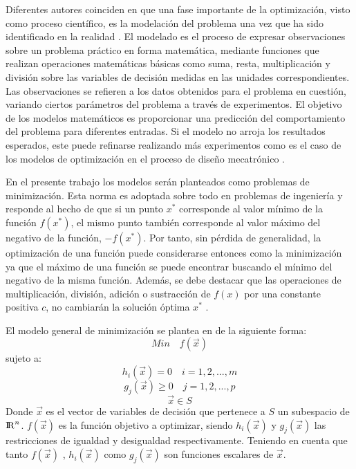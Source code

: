 Diferentes autores coinciden en que una fase importante de la optimización, visto como proceso científico, es la modelación del problema una vez que ha sido identificado en la realidad \cite{rao_engineering_2009} \cite{nocedal2006numerical} \cite{luenberger_linear_2015}. El modelado es el proceso de expresar observaciones sobre un problema práctico en forma matemática, mediante funciones que realizan operaciones matemáticas básicas como suma, resta, multiplicación y división sobre las variables de decisión medidas en las unidades correspondientes. Las observaciones se refieren a los datos obtenidos para el problema en cuestión, variando ciertos parámetros del problema a través de experimentos. El objetivo de los  modelos matemáticos es proporcionar una predicción del comportamiento del problema para diferentes entradas. Si el modelo no arroja los resultados esperados, este puede refinarse realizando más experimentos como es el caso de los modelos de optimización en el proceso de diseño mecatrónico \cite{arora_optimization:_2015}.  

En el presente trabajo los modelos serán planteados como problemas de minimización. Esta norma es adoptada sobre todo en problemas de ingeniería y responde al hecho de que si un punto $x^*$ corresponde al valor mínimo de la función $f(x^*)$, el mismo punto también corresponde al valor máximo del negativo de la función, $-f(x^*)$. Por tanto, sin pérdida de generalidad, la optimización de una función puede considerarse entonces como la minimización ya que el máximo de una función se puede encontrar buscando el mínimo del negativo de la misma función. Además, se debe destacar que las operaciones de multiplicación, división, adición o sustracción de $f(x)$ por una constante positiva $c$, no cambiarán la solución óptima $x^*$ \cite{rao_engineering_2009}. 

El modelo general de minimización se plantea en \cite{luenberger_linear_2015} de la siguiente forma:
\begin{equation}
Min\quad  f(\vec{x})
\end{equation}
sujeto a:
\begin{equation}
h_{i}(\vec{x})=0 \quad i=1,2,...,m
\end{equation}
\begin{equation}
g_{j}(\vec{x}) \geq 0 \quad j=1,2,...,p 
\end{equation}
\begin{equation}
	\vec{x} \in S
\end{equation}
Donde $\vec{x}$ es el vector de variables de decisión que pertenece a $S$ un subespacio de ${\rm I\!R}^{n}$. $f(\vec{x})$  es la función objetivo a optimizar, siendo $h_{i}(\vec{x})$ y $g_{j}(\vec{x})$ las restricciones de igualdad y desigualdad respectivamente. Teniendo en cuenta que tanto $f(\vec{x})$ , $h_{i}(\vec{x})$ como $g_{j}(\vec{x})$ son funciones escalares de $\vec{x}$. 
